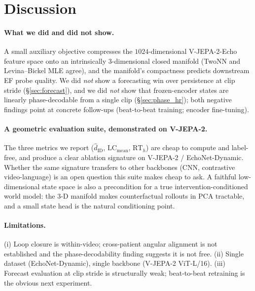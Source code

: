 \documentclass[runningheads]{llncs}
\begin{document}
\section{Discussion}\label{sec:discussion}

\paragraph{What we did and did not show.}
A small auxiliary objective compresses the $1024$-dimensional
V-JEPA-2-Echo feature space onto an intrinsically $3$-dimensional closed
manifold (TwoNN and Levina--Bickel MLE agree), and the manifold's
compactness predicts downstream EF probe quality. We did \emph{not}
show a forecasting win over persistence at clip stride
(\S\ref{sec:forecast}), and we did \emph{not} show that frozen-encoder
states are linearly phase-decodable from a single clip
(\S\ref{sec:phase_hr}); both negative findings point at concrete
follow-ups (beat-to-beat training; encoder fine-tuning).

\paragraph{A geometric evaluation suite, demonstrated on V-JEPA-2.}
The three metrics we report ($\widehat{d}_\mathrm{ID}$,
$\mathrm{LC}_\mathrm{mean}$, $\mathrm{RT}_h$) are cheap to compute and
label-free, and produce a clear ablation signature on V-JEPA-2 /
EchoNet-Dynamic. Whether the same signature transfers to other
backbones (CNN, contrastive video-language) is an open question this
suite makes cheap to ask. A faithful low-dimensional state space is
also a precondition for a true intervention-conditioned world model:
the $3$-D manifold makes counterfactual rollouts in PCA tractable,
and a small state head is the natural conditioning point.

\paragraph{Limitations.}
(i) Loop closure is within-video; cross-patient angular alignment is not
established and the phase-decodability finding suggests it is not free.
(ii) Single dataset (EchoNet-Dynamic), single backbone (V-JEPA-2
ViT-L/16). (iii) Forecast evaluation at clip stride is structurally
weak; beat-to-beat retraining is the obvious next experiment.

\end{document}
